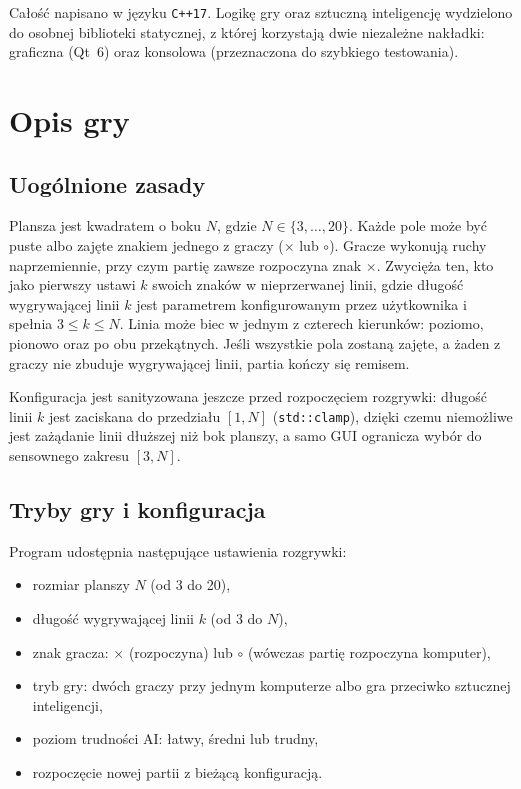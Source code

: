 Całość napisano w języku \texttt{C++17}. Logikę gry oraz sztuczną inteligencję wydzielono
do osobnej biblioteki statycznej, z której korzystają dwie niezależne nakładki: graficzna
(Qt~6) oraz konsolowa (przeznaczona do szybkiego testowania).


\section{Opis gry}

\subsection{Uogólnione zasady}

Plansza jest kwadratem o boku $N$, gdzie $N \in \{3,\dots,20\}$. Każde pole może być puste albo
zajęte znakiem jednego z graczy ($\times$ lub $\circ$). Gracze wykonują ruchy naprzemiennie,
przy czym partię zawsze rozpoczyna znak $\times$. Zwycięża ten, kto jako pierwszy ustawi $k$
swoich znaków w nieprzerwanej linii, gdzie długość wygrywającej linii $k$ jest parametrem
konfigurowanym przez użytkownika i spełnia $3 \le k \le N$. Linia może biec w jednym z czterech
kierunków: poziomo, pionowo oraz po obu przekątnych. Jeśli wszystkie pola zostaną zajęte, a żaden
z graczy nie zbuduje wygrywającej linii, partia kończy się remisem.

Konfiguracja jest sanityzowana jeszcze przed rozpoczęciem rozgrywki: długość linii $k$ jest
zaciskana do przedziału $[1, N]$ (\texttt{std::clamp}), dzięki czemu niemożliwe jest zażądanie
linii dłuższej niż bok planszy, a samo GUI ogranicza wybór do sensownego zakresu $[3, N]$.

\subsection{Tryby gry i konfiguracja}

Program udostępnia następujące ustawienia rozgrywki:
\begin{itemize}
    \item rozmiar planszy $N$ (od 3 do 20),
    \item długość wygrywającej linii $k$ (od 3 do $N$),
    \item znak gracza: $\times$ (rozpoczyna) lub $\circ$ (wówczas partię rozpoczyna komputer),
    \item tryb gry: dwóch graczy przy jednym komputerze albo gra przeciwko sztucznej inteligencji,
    \item poziom trudności AI: łatwy, średni lub trudny,
    \item rozpoczęcie nowej partii z bieżącą konfiguracją.
\end{itemize}

